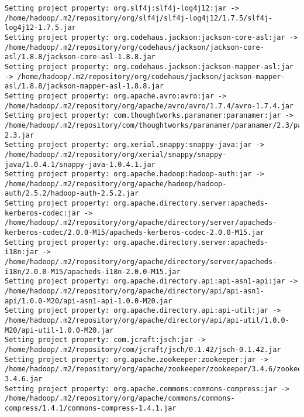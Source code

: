 \begin{verbatim}
Setting project property: org.slf4j:slf4j-log4j12:jar -> /home/hadoop/.m2/repository/org/slf4j/slf4j-log4j12/1.7.5/slf4j-log4j12-1.7.5.jar
Setting project property: org.codehaus.jackson:jackson-core-asl:jar -> /home/hadoop/.m2/repository/org/codehaus/jackson/jackson-core-asl/1.8.8/jackson-core-asl-1.8.8.jar
Setting project property: org.codehaus.jackson:jackson-mapper-asl:jar -> /home/hadoop/.m2/repository/org/codehaus/jackson/jackson-mapper-asl/1.8.8/jackson-mapper-asl-1.8.8.jar
Setting project property: org.apache.avro:avro:jar -> /home/hadoop/.m2/repository/org/apache/avro/avro/1.7.4/avro-1.7.4.jar
Setting project property: com.thoughtworks.paranamer:paranamer:jar -> /home/hadoop/.m2/repository/com/thoughtworks/paranamer/paranamer/2.3/paranamer-2.3.jar
Setting project property: org.xerial.snappy:snappy-java:jar -> /home/hadoop/.m2/repository/org/xerial/snappy/snappy-java/1.0.4.1/snappy-java-1.0.4.1.jar
Setting project property: org.apache.hadoop:hadoop-auth:jar -> /home/hadoop/.m2/repository/org/apache/hadoop/hadoop-auth/2.5.2/hadoop-auth-2.5.2.jar
Setting project property: org.apache.directory.server:apacheds-kerberos-codec:jar -> /home/hadoop/.m2/repository/org/apache/directory/server/apacheds-kerberos-codec/2.0.0-M15/apacheds-kerberos-codec-2.0.0-M15.jar
Setting project property: org.apache.directory.server:apacheds-i18n:jar -> /home/hadoop/.m2/repository/org/apache/directory/server/apacheds-i18n/2.0.0-M15/apacheds-i18n-2.0.0-M15.jar
Setting project property: org.apache.directory.api:api-asn1-api:jar -> /home/hadoop/.m2/repository/org/apache/directory/api/api-asn1-api/1.0.0-M20/api-asn1-api-1.0.0-M20.jar
Setting project property: org.apache.directory.api:api-util:jar -> /home/hadoop/.m2/repository/org/apache/directory/api/api-util/1.0.0-M20/api-util-1.0.0-M20.jar
Setting project property: com.jcraft:jsch:jar -> /home/hadoop/.m2/repository/com/jcraft/jsch/0.1.42/jsch-0.1.42.jar
Setting project property: org.apache.zookeeper:zookeeper:jar -> /home/hadoop/.m2/repository/org/apache/zookeeper/zookeeper/3.4.6/zookeeper-3.4.6.jar
Setting project property: org.apache.commons:commons-compress:jar -> /home/hadoop/.m2/repository/org/apache/commons/commons-compress/1.4.1/commons-compress-1.4.1.jar


\end{verbatim}
